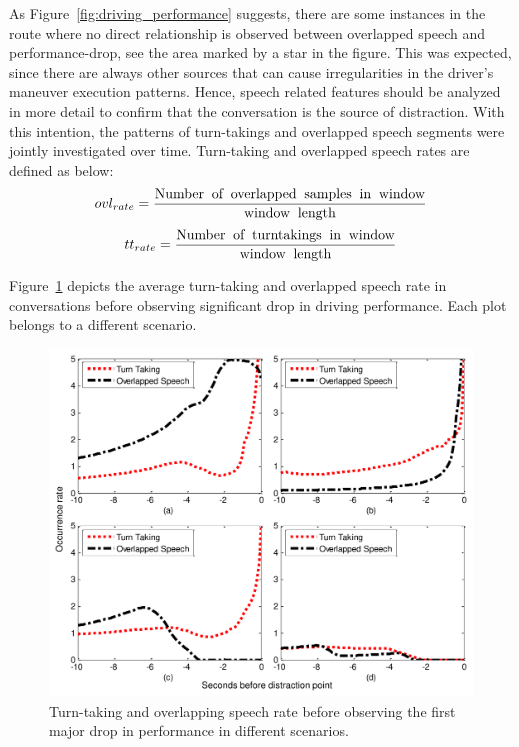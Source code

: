 As Figure~\ref{fig:driving_performance} suggests, there are some instances in the route where no direct relationship is observed between overlapped speech and performance-drop, see the area marked by a star in the figure. 
This was expected, since there are always other sources that can cause irregularities in the driver's maneuver execution patterns. 
Hence, speech related features should be analyzed in more detail to confirm that the conversation is the source of distraction. 
With this intention, the patterns of turn-takings and overlapped speech segments were jointly investigated over time. 
Turn-taking and overlapped speech rates are defined as below:
\begin{equation}
ovl_{rate} = \dfrac{\textrm{Number\: of\: overlapped\: samples\: in\: window}}{\textrm{window\: length}} \nonumber
\end{equation}
\begin{equation}
tt_{rate} = \dfrac{\textrm{Number\: of\: turntakings\: in\: window}}{\textrm{window\: length}} \nonumber
\end{equation}

Figure~\ref{fig:turntaking_and_overlap} depicts the average turn-taking and overlapped speech rate in conversations before observing significant drop in driving performance. 
Each plot belongs to a different scenario. 

\begin{figure}[h!]
	\vspace{-5mm}
	\centering
	\includegraphics[scale=0.5]{figures/ttr_and_ovl}
	\caption {Turn-taking and overlapping speech rate before observing the first major drop in performance in different scenarios.}
	\label{fig:turntaking_and_overlap} 
\end{figure}


